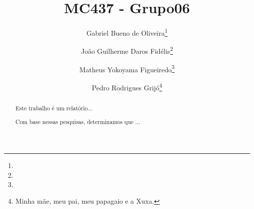 \documentclass[11pt,twoside]{article}
\begin{document}
% 

%



\TRMakeCover


%
\pagestyle{myheadings}

%
\title{MC437 - Grupo06}

\author{Gabriel Bueno de Oliveira\thanks{} \and
Jo{\~a}o Guilherme Daros Fid{\'e}lis\thanks{} \and
Matheus Yokoyama Figueiredo\thanks{} \and Pedro Rodrigues Grij{\'o}\thanks{Minha m{\~a}e, meu pai, meu papagaio e a Xuxa.}}

\date{}

\maketitle


\begin{abstract} 
  Este trabalho é um relatório...

  Com base nessas pesquisas, determinamos que ...
\end{abstract}
\end{document}
